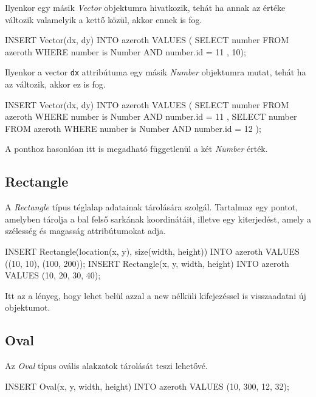 Ilyenkor egy másik \textit{Vector} objektumra hivatkozik, tehát ha annak az értéke változik valamelyik a kettő közül, akkor ennek is fog.

\begin{sql}
INSERT Vector(dx, dy) INTO azeroth VALUES (
{ SELECT number FROM azeroth
  WHERE number is Number AND number.id = 11 }, 10);
\end{sql}

Ilyenkor a vector \texttt{dx} attribútuma egy másik \textit{Number} objektumra mutat, tehát ha az változik, akkor ez is fog.

\newpage

\begin{sql}
INSERT Vector(dx, dy) INTO azeroth VALUES (
    { SELECT number FROM azeroth
      WHERE number is Number AND number.id = 11 },
    { SELECT number FROM azeroth
      WHERE number is Number AND number.id = 12 }
);
\end{sql}

A ponthoz hasonlóan itt is megadható függetlenül a két \textit{Number} érték.


\subsection{Rectangle}

A \textit{Rectangle} típus téglalap adatainak tárolására szolgál. Tartalmaz egy pontot, amelyben tárolja a bal felső sarkának koordinátáit, illetve egy kiterjedést, amely a szélesség és magasság attribútumokat adja.

\begin{sql}
INSERT Rectangle(location(x, y), size(width, height)) INTO azeroth 
VALUES ((10, 10), (100, 200)); 
INSERT Rectangle(x, y, width, height) INTO azeroth
VALUES (10, 20, 30, 40);
\end{sql}

Itt az a lényeg, hogy lehet belül azzal a new nélküli kifejezéssel is visszaadatni új objektumot.

\subsection{Oval}

Az \textit{Oval} típus ovális alakzatok tárolását teszi lehetővé. 

\begin{sql}
INSERT Oval(x, y, width, height) INTO azeroth 
VALUES (10, 300, 12, 32);
\end{sql}


